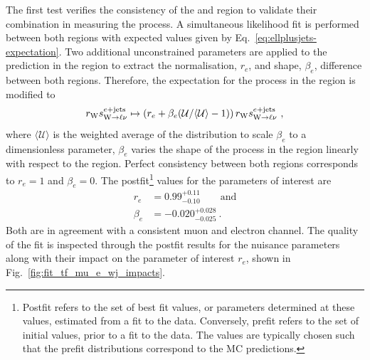 The first test verifies the consistency of the \muplusjets and \eleplusjets region to validate their combination in measuring the \IWj process. A simultaneous likelihood fit is performed between both regions with expected values given by Eq.~\ref{eq:ellplusjets-expectation}. Two additional unconstrained parameters are applied to the \IWj prediction in the \eleplusjets region to extract the normalisation, $r_e$, and shape, $\beta_e$, difference between both regions. Therefore, the expectation for the \IWj process in the \eleplusjets region is modified to
%
\begin{equation}
    r_{\PW}s_{\IWlv}^{\eleplusjets}\mapsto \left(r_e + \beta_{e}(\recoil/\langle\recoil\rangle-1)\right)r_{\PW}s_{\IWlv}^{\eleplusjets}\ ,
\end{equation}
%
where $\langle \mathcal{U} \rangle$ is the weighted average of the \recoil distribution to scale $\beta_e$ to a dimensionless parameter, $\beta_e$ varies the shape of the \IWj process in the \eleplusjets region linearly with respect to the \muplusjets region. Perfect consistency between both regions corresponds to $r_e=1$ and $\beta_e=0$. The postfit\footnote{Postfit refers to the set of best fit values, or parameters determined at these values, estimated from a fit to the data. Conversely, prefit refers to the set of initial values, prior to a fit to the data. The values are typically chosen such that the prefit distributions correspond to the MC predictions.} values for the parameters of interest are
%
\begin{align}
    r_e & = 0.99^{+0.11}_{-0.10}\qquad \mathrm{and}\nonumber\\
    \beta_e & = -0.020^{+0.028}_{-0.025}\ .
\end{align}
%
Both are in agreement with a consistent muon and electron channel. The quality of the fit is inspected through the postfit results for the nuisance parameters along with their impact on the parameter of interest $r_e$, shown in Fig.~\ref{fig:fit_tf_mu_e_wj_impacts}.
%
